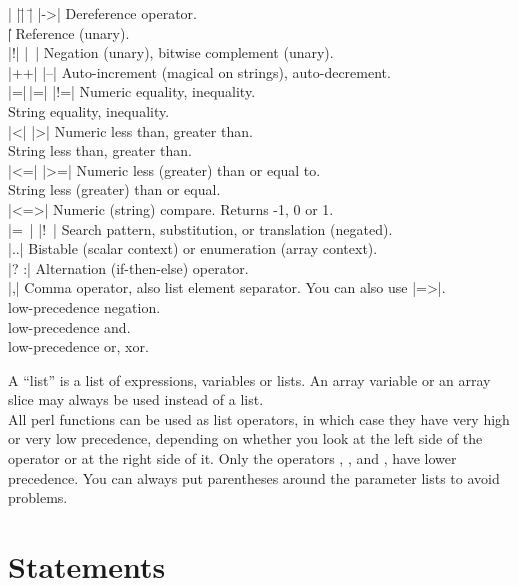 \begin{tabbing}
|    |\=|    |\= \kill
|->| \> \> Dereference operator.\ddag \\
|\| \> \> Reference (unary).\ddag \\
|!| \> |~| \> Negation (unary), bitwise complement (unary). \\
|++| \> |--| \> Auto-increment (magical on strings), auto-decrement. \\
|=|\,|=| \> |!=| \> Numeric equality, inequality. \\
 \>  \> String equality, inequality. \\
|<|  \>  |>|  \> Numeric less than, greater than. \\
 \>  \> String less than, greater than. \\
|<=| \> |>=| \> Numeric less (greater) than or equal to. \\
 \>  \> String less (greater) than or equal. \\
|<=>| \>  \> Numeric (string) compare. Returns -1, 0 or 1. \\
|=~| \> |!~| \> Search pattern, substitution, or translation (negated). \\
|..| \> \> Bistable (scalar context) or enumeration (array context). \\
|? :|\>      \> Alternation (if-then-else) operator. \\
|,| \> \> Comma operator, also list element separator.
You can also use |=>|.\\
 \> \> low-precedence negation. \\
 \> \> low-precedence and. \\
 \>  \> low-precedence or, xor.
\end{tabbing}

A ``list'' is a list of expressions, variables
or lists. An array variable or an array slice may always be used
instead of a list.  
\\
All perl functions can be used as list operators, in which case they have 
very high or very low precedence, depending on whether you look at the left
side of the operator or at the right side of it.
\newline Only the operators , ,  and , 
have lower precedence.
\newline You can always put parentheses around the parameter lists 
to avoid problems.


\section{Statements} 

